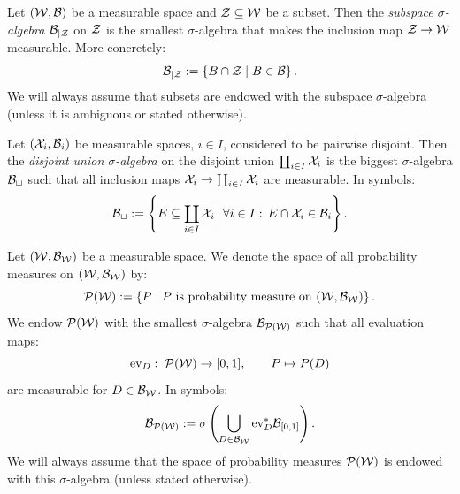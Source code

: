 



\begin{Def}
    Let $(\mathcal{W},\mathcal{B})$ be a measurable space and $\mathcal{Z} \subseteq \mathcal{W}$ be a subset.
    Then the \emph{subspace $\sigma$-algebra} $\mathcal{B}_{|\mathcal{Z}}$ on $\mathcal{Z}$ is the smallest $\sigma$-algebra that makes the inclusion map $\mathcal{Z} \to \mathcal{W}$ measurable. More concretely:
    \[\mathcal{B}_{|\mathcal{Z}} := \left \{ B \cap \mathcal{Z} \;|\; B \in \mathcal{B}   \right \}.\]
    We will always assume that subsets are endowed with the subspace $\sigma$-algebra (unless it is ambiguous or stated otherwise).
\end{Def}

\begin{Def}
 Let $(\mathcal{X}_i,\mathcal{B}_i)$ be measurable spaces, $i \in I$, considered to be pairwise disjoint.
 Then the \emph{disjoint union $\sigma$-algebra} on the disjoint union 
 $ \coprod_{ i \in I} \mathcal{X}_i$ 
 is the biggest $\sigma$-algebra $\mathcal{B}_\sqcup $ such that all inclusion maps $\mathcal{X}_i \to \coprod_{i \in I} \mathcal{X}_i$ are measurable.
 In symbols:
 \[ \mathcal{B}_\sqcup := \left \{ E \subseteq {\coprod_{ i \in I} \mathcal{X}_i} \,\bigg|\,  \forall i \in I:\, E \cap \mathcal{X}_i \in \mathcal{B}_i\right \}. \]
\end{Def}

\begin{Def}
    \label{def-sigma-algebra-prob-space}
    Let $(\mathcal{W},\mathcal{B}_{\mathcal{W}})$ be a measurable space. We denote the space of all probability measures on  $(\mathcal{W},\mathcal{B}_{\mathcal{W}})$ by:
    \[ \mathcal{P}(\mathcal{W}) := \left \{ P \;|\; P \text{ is probability measure on } (\mathcal{W},\mathcal{B}_{\mathcal{W}}) \right \}.\]
    We endow $\mathcal{P}(\mathcal{W})$ with the smallest $\sigma$-algebra $\mathcal{B}_{\mathcal{P}(\mathcal{W})}$ such that all evaluation maps:
    \[  \mathrm{ev}_D:\; \mathcal{P}(\mathcal{W}) \to [0,1],\qquad P \mapsto P(D)  \]
    are measurable for $D \in \mathcal{B}_{\mathcal{W}}$.
    In symbols:
    \[ \mathcal{B}_{\mathcal{P}(\mathcal{W})} := \sigma\left ( \bigcup_{D \in \mathcal{B}_{\mathcal{W}}} \mathrm{ev}_D^*\mathcal{B}_{[0,1]} \right ).\]
    We will always assume that the space of probability measures $\mathcal{P}(\mathcal{W})$ is endowed with this $\sigma$-algebra (unless stated otherwise).
\end{Def}


